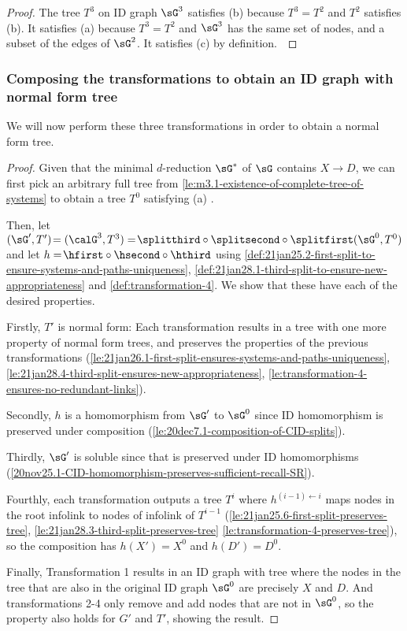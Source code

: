 \begin{proof} 
The tree $T^3$ on ID graph $\sG^3$ satisfies (b) 
because $T^3\!=\!T^2$ and $T^2$ satisfies (b).
It satisfies (a) because $T^3\!=\!T^2$ and $\sG^3$ has the same set of nodes, and a subset of the edges of $\sG^2$. 
It satisfies (c) by definition.~
\end{proof}




\subsubsection{Composing the transformations to obtain an ID graph with normal form tree}

We will now perform these three transformations in order 
to obtain a normal form tree.


\lenormalformtransform*


\begin{proof}

Given that the minimal $d$-reduction $\sG^*$ of $\sG$ contains $X \to D$, we can first pick an arbitrary full tree from \autoref{le:m3.1-existence-of-complete-tree-of-systems} to obtain a tree $T^0$ satisfying (a) \systemsAndPathsUniqueness.

Then, let $(\sG', T')\!=(\calG^3,T^3)=\!\splitthird \circ \splitsecond \circ \splitfirst (\sG^0,T^0)$
and let $h=\!\hfirst \circ \hsecond\circ \hthird$
using \autoref{def:21jan25.2-first-split-to-ensure-systems-and-paths-uniqueness},  \autoref{def:21jan28.1-third-split-to-ensure-new-appropriateness}
and \autoref{def:transformation-4}.
We show that these have each of the desired properties.%

Firstly, $T'$ is normal form:  Each transformation results in a tree with one more property of normal form trees, and preserves the properties of the previous transformations (\autoref{le:21jan26.1-first-split-ensures-systems-and-paths-uniqueness},  \autoref{le:21jan28.4-third-split-ensures-new-appropriateness}, \autoref{le:transformation-4-ensures-no-redundant-links}).~

Secondly, $h$ is a homomorphism from $\sG'$ to $\sG^0$ since ID homomorphism is preserved under composition (\autoref{le:20dec7.1-composition-of-CID-splits}). 

Thirdly, $\sG'$ is soluble since that is preserved under ID homomorphisms (\autoref{20nov25.1-CID-homomorphism-preserves-sufficient-recall-SR}{}).

Fourthly, each transformation outputs a tree $T^i$ where $h^{(i-1) \gets i}$ maps nodes in the root infolink 
to nodes of infolink of $T^{i-1}$
(\autoref{le:21jan25.6-first-split-preserves-tree},  \autoref{le:21jan28.3-third-split-preserves-tree}
\autoref{le:transformation-4-preserves-tree}),
so the composition has $h(X')=X^0$ and $h(D')=D^0$.


Finally, Transformation 1 results in an ID graph with tree where the nodes in the tree that are also in the original ID graph $\sG^0$ are precisely $X$ and $D$. And transformations 2-4 only remove and add nodes that are not in $\sG^0$, so the property also holds for $G'$ and $T'$, showing the result.
\end{proof}


